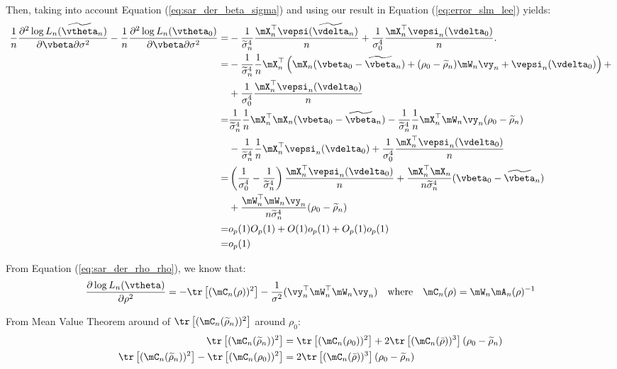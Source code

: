 \documentclass[english,12pt]{book}\usepackage[]{graphicx}\usepackage[]{xcolor}
\begin{document}
\begin{subappendices}
\begin{enumerate}
   Then, taking into account Equation (\ref{eq:sar_der_beta_sigma}) and using our result in Equation (\ref{eq:error_slm_lee}) yields:
      \begin{equation*}
    \begin{aligned}
    \frac{1}{n}\frac{\partial^2 \log L_n(\widetilde{\vtheta}_n)}{\partial \vbeta \partial \sigma^2} - \frac{1}{n}\frac{\partial^2 \log L_n(\vtheta_0)}{\partial \vbeta \partial \sigma^2}  = & - \frac{1}{\widetilde{\sigma}^4_n} \frac{\mX_n^\top \vepsi(\widetilde{\vdelta}_n)}{n}+  \frac{1}{\sigma^4_0} \frac{\mX^\top_n \vepsi_n(\vdelta_0)}{n}. \\
     = & - \frac{1}{\widetilde{\sigma}^4_n}\frac{1}{n}\mX_n^\top\left(\mX_n(\vbeta_0 - \widetilde{\vbeta}_n) + (\rho_0 - \widetilde{\rho}_n)\mW_n\vy_n + \vepsi_n(\vdelta_0) \right)+  \\
    & + \frac{1}{\sigma^4_0} \frac{\mX_n^\top \vepsi_n(\vdelta_0)}{n} \\
   = & \frac{1}{\widetilde{\sigma}^4_n}\frac{1}{n}\mX_n^\top\mX_n(\vbeta_0 - \widetilde{\vbeta}_n) - \frac{1}{\widetilde{\sigma}^4_n}\frac{1}{n}\mX_n^\top\mW_n\vy_n(\rho_0 - \widetilde{\rho}_n)  \\
   & - \frac{1}{\widetilde{\sigma}^4_n}\frac{1}{n}\mX_n^\top \vepsi_n(\vdelta_0)  + \frac{1}{\sigma^4_0} \frac{\mX_n^\top \vepsi_n(\vdelta_0)}{n} \\
   = & \left(\frac{1}{\sigma^4_0} - \frac{1}{\widetilde{\sigma}^4_n}\right)\frac{\mX^\top_n \vepsi_n(\vdelta_0)}{n} + \frac{\mX^\top_n\mX_n}{n\widetilde{\sigma}^4_n}(\vbeta_0 - \widetilde{\vbeta}_n)  \\
   & + \frac{\mW_n^\top\mW_n\vy_n}{n\widetilde{\sigma}^4_n}(\rho_0 - \widetilde{\rho}_n) \\
   = & o_p(1)O_p(1) + O(1)o_p(1) + O_p(1)o_p(1) \\
   = & o_p(1)
    \end{aligned}
   \end{equation*}
   
   From Equation (\ref{eq:sar_der_rho_rho}), we know that:
   \begin{equation*}
   \frac{\partial \log L_n(\vtheta) }{\partial \rho ^2} = - \tr\left[(\mC_n(\rho))^2\right] - \frac{1}{\sigma^2}(\vy_n^{\top}\mW^{\top}_n\mW_n\vy_n)\quad \mbox{where}\quad \mC_n(\rho) = \mW_n\mA_n(\rho)^{-1}
   \end{equation*}
   
   From Mean Value Theorem around of  $\tr\left[(\mC_n(\widetilde{\rho}_n))^2\right]$ around $\rho_0$:
   \begin{equation*}
    \begin{aligned}
    \tr\left[(\mC_n(\widetilde{\rho}_n))^2\right] & = \tr\left[(\mC_n(\rho_0))^2\right]+ 2\tr\left[(\mC_n(\bar{\rho}))^3\right](\rho_0 - \widetilde{\rho}_n) \\
    \tr\left[(\mC_n(\widetilde{\rho}_n))^2\right] - \tr\left[(\mC_n(\rho_0))^2\right] & = 2\tr\left[(\mC_n(\bar{\rho}))^3\right](\rho_0 - \widetilde{\rho}_n)
    \end{aligned}
   \end{equation*}
   

\end{enumerate}
\end{subappendices}
\end{document}
